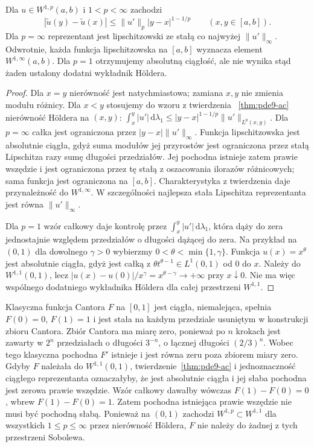 \begin{wniosek}
Dla $u\in W^{1,p}(a,b)$ i $1<p<\infty$ zachodzi
\[
 |\widetilde u(y)-\widetilde u(x)|
 \le\|u'\|_p|y-x|^{1-1/p}\qquad(x,y\in[a,b]).
\]
Dla $p=\infty$ reprezentant jest lipschitzowski ze stałą
co najwyżej $\|u'\|_\infty$. Odwrotnie, każda funkcja
lipschitzowska na $[a,b]$ wyznacza element $W^{1,\infty}(a,b)$.
Dla $p=1$ otrzymujemy absolutną ciągłość, ale nie wynika
stąd żaden ustalony dodatni wykładnik Höldera.
\end{wniosek}
\begin{proof}
Dla $x=y$ nierówność jest natychmiastowa; zamiana
$x,y$ nie zmienia modułu różnicy. Dla $x<y$
stosujemy do wzoru z twierdzenia
~\ref{thm:pde9-ac} nierówność Höldera na $(x,y)$:
$\int_x^y|u'|\,\mathrm d\lambda_1
\le |y-x|^{1-1/p}\|u'\|_{L^p(x,y)}$.
Dla $p=\infty$ całka jest ograniczona przez
$|y-x|\|u'\|_\infty$. Funkcja lipschitzowska jest absolutnie
ciągła, gdyż suma modułów jej przyrostów jest ograniczona
przez stałą Lipschitza razy sumę długości przedziałów.
Jej pochodna istnieje zatem prawie wszędzie
i jest ograniczona przez tę stałą z oszacowania ilorazów
różnicowych; sama funkcja jest ograniczona na $[a,b]$.
Charakterystyka z twierdzenia daje przynależność
do $W^{1,\infty}$. W szczególności najlepsza stała
Lipschitza reprezentanta jest równa $\|u'\|_\infty$.

Dla $p=1$ wzór całkowy daje kontrolę przez
$\int_x^y|u'|\,\mathrm d\lambda_1$, która dąży do zera
jednostajnie względem przedziałów o długości dążącej do zera.
Na przykład na $(0,1)$ dla dowolnego $\gamma>0$ wybierzmy
$0<\theta<\min\{1,\gamma\}$. Funkcja $u(x)=x^\theta$
jest absolutnie ciągła, gdyż jest całką z
$\theta t^{\theta-1}\in L^1(0,1)$ od $0$ do $x$.
Należy do $W^{1,1}(0,1)$, lecz
$|u(x)-u(0)|/x^\gamma=x^{\theta-\gamma}\to+\infty$
przy $x\downarrow0$. Nie ma więc wspólnego dodatniego
wykładnika Höldera dla całej przestrzeni $W^{1,1}$.
\end{proof}

\begin{przyklad}
Klasyczna funkcja Cantora $F$ na $[0,1]$ jest ciągła,
niemalejąca, spełnia $F(0)=0$, $F(1)=1$ i jest stała na każdym
przedziale usuniętym w konstrukcji zbioru Cantora.
Zbiór Cantora ma miarę zero, ponieważ po $n$ krokach
jest zawarty w $2^n$ przedziałach o długości $3^{-n}$,
o łącznej długości $(2/3)^n$.
Wobec tego klasyczna pochodna $F'$ istnieje i jest równa zeru
poza zbiorem miary zero. Gdyby $F$ należała do $W^{1,1}(0,1)$,
twierdzenie~\ref{thm:pde9-ac} i jednoznaczność ciągłego
reprezentanta oznaczałyby, że jest absolutnie ciągła
i jej słaba pochodna jest zerowa prawie wszędzie.
Wzór całkowy dawałby wówczas $F(1)-F(0)=0$,
wbrew $F(1)-F(0)=1$.
Zatem pochodna istniejąca prawie wszędzie nie musi być
pochodną słabą. Ponieważ na $(0,1)$ zachodzi
$W^{1,p}\subset W^{1,1}$ dla wszystkich $1\le p\le\infty$
przez nierówność Höldera, $F$ nie należy do żadnej z tych
przestrzeni Sobolewa.
\end{przyklad}

